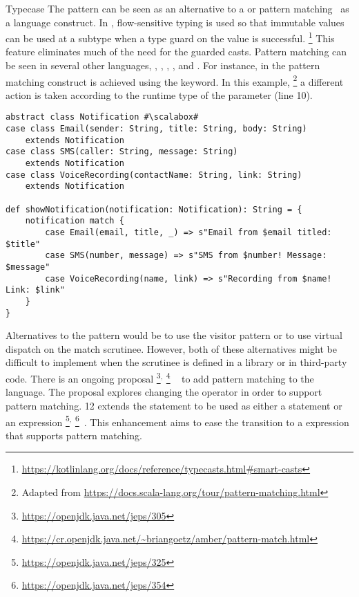 \begin{pattern}{Typecase}
The \thisp{} pattern can be seen as an \adhoc{} alternative to a
 or pattern matching~\citep{milnerProposalStandardML1984} as a
language construct.
In \kotlin{}, flow-sensitive typing is used so that immutable values can be
used at a subtype when a type guard on the value is successful.%
\footnote{\url{https://kotlinlang.org/docs/reference/typecasts.html\#smart-casts}}
This feature eliminates much of the need for the guarded casts.
Pattern matching can be seen in several other languages, \eg, \ml{}, \scala{}, \csharp{}, and \haskell{}.
For instance, in \scala{} the pattern matching construct is achieved using the  keyword.
In this example,%
\footnote{Adapted from \url{https://docs.scala-lang.org/tour/pattern-matching.html}}
a different action is taken according to the runtime type of the parameter  (line 10).

\begin{verbatim}
abstract class Notification #\scalabox#
case class Email(sender: String, title: String, body: String)
	extends Notification
case class SMS(caller: String, message: String)
	extends Notification
case class VoiceRecording(contactName: String, link: String)
	extends Notification

def showNotification(notification: Notification): String = {
	notification match {
		case Email(email, title, _) => s"Email from $email titled: $title"
		case SMS(number, message) => s"SMS from $number! Message: $message"
		case VoiceRecording(name, link) => s"Recording from $name! Link: $link"
	}
}
\end{verbatim}

Alternatives to the \thisp{} pattern would be to use the visitor pattern or to use virtual dispatch on the match scrutinee.
However, both of these alternatives might be difficult to implement when the scrutinee is defined in a library or in third-party code.
There is an ongoing proposal%
\footnote{\url{https://openjdk.java.net/jeps/305}}$^{,}$%
\footnote{\url{https://cr.openjdk.java.net/~briangoetz/amber/pattern-match.html}}%
~\citep{jep305} to add pattern matching to the \java{} language.
The proposal explores changing the  operator in order to support pattern matching.
\java{} 12 extends the  statement to be used as either a statement or an expression%
\footnote{\url{https://openjdk.java.net/jeps/325}}$^{,}$%
\footnote{\url{https://openjdk.java.net/jeps/354}}~\citep{jep325,jep354}.
This enhancement aims to ease the transition to a  expression that supports pattern matching.


\end{pattern}
